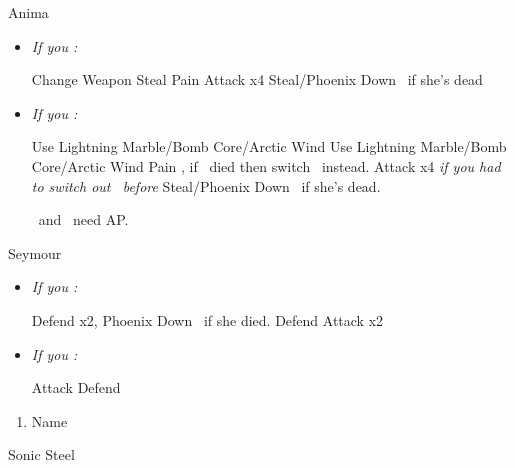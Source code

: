 \vfill
\begin{battle}[18000]{Anima}
\begin{itemize}
\item \textit{If you \wonblitz:}
  \begin{itemize}
    \switch{\tidus}{\wakka}
    \wakkaf Change Weapon
            \kimahrif Steal
          \enemyf Pain
          \tidusf Attack x4
          \rikkuf Steal/Phoenix Down \yuna\ if she's dead
  \end{itemize}
  \item \textit{If you \lostblitz:}
  \begin{itemize}
  \rikkuf Use Lightning Marble/Bomb Core/Arctic Wind
  \switch{\tidus}{\wakka}
  \kimahrif Use Lightning Marble/Bomb Core/Arctic Wind
  \enemyf Pain
  \switch{\wakka}{\tidus}, if \wakka\ died then switch \rikku\ instead.
  \tidusf Attack x4
  \switch{\kimahri}{\rikku} \textit{if you had to switch out \rikku\ before}
  \rikkuf Steal/Phoenix Down \yuna\ if she's dead.
  \end{itemize}
 \tidus\ and \yuna\ need AP.
\end{itemize}
\end{battle}
\begin{battle}[6000]{Seymour}
  \begin{itemize}
  \item \textit{If you \wonblitz:}
  \begin{itemize}
    \tidusf Defend x2, Phoenix Down \rikku\ if she died.
    \rikkuf Defend
    \tidusf Attack x2
    \end{itemize}
    \item \textit{If you \lostblitz:}
    \begin{itemize}
    \tidusf Attack
    \rikkuf Defend
    \end{itemize}
  \end{itemize}
\end{battle}
\begin{enumerate}[resume]
  \item Name \shiva
\end{enumerate}
\begin{equip}
\begin{itemize}
\tidusf Sonic Steel
\end{itemize}
\end{equip}

